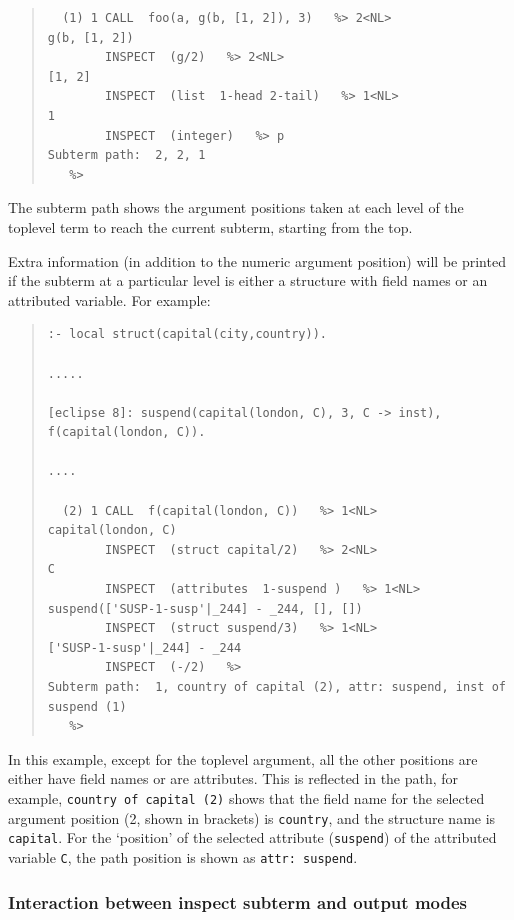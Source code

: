 \begin{descr}{1cm}
\begin{quote}\begin{verbatim}
  (1) 1 CALL  foo(a, g(b, [1, 2]), 3)   %> 2<NL>
g(b, [1, 2])
        INSPECT  (g/2)   %> 2<NL>
[1, 2]
        INSPECT  (list  1-head 2-tail)   %> 1<NL>
1
        INSPECT  (integer)   %> p
Subterm path:  2, 2, 1
   %> 
\end{verbatim}\end{quote}

The subterm path shows the argument positions taken at each level of the
toplevel term to reach the current subterm, starting from the top. 

Extra information (in addition to the numeric argument position) will be
printed if the subterm at a particular level is either a structure with
field names or an attributed variable. For example:

\begin{quote}\begin{verbatim}
:- local struct(capital(city,country)).

.....

[eclipse 8]: suspend(capital(london, C), 3, C -> inst), f(capital(london, C)).

....

  (2) 1 CALL  f(capital(london, C))   %> 1<NL>
capital(london, C)
        INSPECT  (struct capital/2)   %> 2<NL>
C
        INSPECT  (attributes  1-suspend )   %> 1<NL>
suspend(['SUSP-1-susp'|_244] - _244, [], [])
        INSPECT  (struct suspend/3)   %> 1<NL>
['SUSP-1-susp'|_244] - _244
        INSPECT  (-/2)   %> 
Subterm path:  1, country of capital (2), attr: suspend, inst of suspend (1)
   %>
\end{verbatim}\end{quote}

In this example, except for the toplevel argument, all the other positions are
either have field names or are attributes. This is reflected in the path,
for example, {\tt country of capital (2)} shows that the field name for
the selected argument position (2, shown in brackets) is \verb'country',
and the structure name is \verb'capital'. For the `position' of the
selected attribute (\verb'suspend') of the attributed variable \verb'C',
the path position is shown as {\tt attr: suspend}.


\subsubsection{Interaction between inspect subterm and output modes}


\end{descr}
